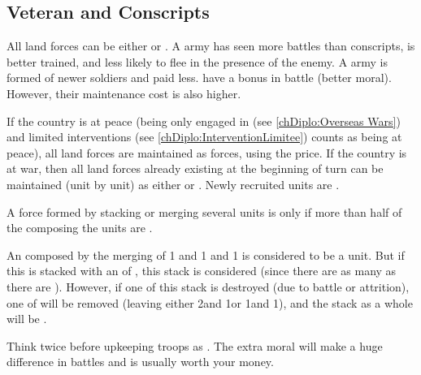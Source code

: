 \subsection{Veteran and Conscripts}
\label{chMilitary:Veteran Conscripts}

 All land forces can be either
 or . A  army has seen more
battles than conscripts, is better trained, and less likely to flee in the
presence of the enemy. A  army is formed of newer soldiers
and paid less.
\bparag {} have a bonus in battle (better moral). However, their
maintenance cost is also higher.

 If the country is at peace (being only engaged in
 (see \ref{chDiplo:Overseas Wars}) and limited
interventions (see \ref{chDiplo:InterventionLimitee}) counts as being at
peace), all land forces are maintained as  forces, using the
 price.
\bparag If the country is at war, then all land forces already existing at the
beginning of turn can be maintained (unit by unit) as either 
or . Newly recruited units are .

 A force formed by stacking or merging several units is
 only if more than half of the \LD composing the units are
.

\begin{exemple}
  An \ARMY\faceplus composed by the merging of 1  \LD and 1
   \ARMY\facemoins and 1  \LD is considered to
  be a  unit. But if this \ARMY\faceplus is stacked with an
  \ARMY\facemoins of , this stack is considered
   (since there are as many  as there are
  ). However, if one \LD of this stack is destroyed (due to
  battle or attrition), one \LD of  will be removed (leaving
  either 2\ARMY\facemoins and 1\LD or 1\ARMY\faceplus and 1\LD), and the stack
  as a whole will be .
\end{exemple}

\begin{playtip}
  Think twice before upkeeping troops as . The extra moral
  will make a huge difference in battles and is usually worth your money.
\end{playtip}


